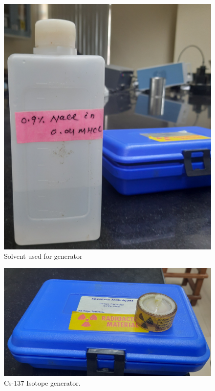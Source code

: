 \documentclass[a4paper, amsfonts, amssymb, amsmath, reprint, showkeys, nofootinbib, twoside]{revtex4-1}
\begin{document}
\begin{figure}[H]
	\centering
	\includegraphics[scale=0.09]{3} 
	\caption{Solvent used for generator}
\end{figure}

\begin{figure}[H]
	\centering
	\includegraphics[scale=0.06]{4} 
	\caption{Cs-137 Isotope generator.}
\end{figure}
\end{document}
